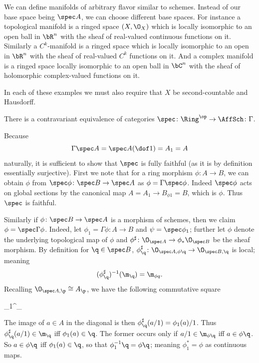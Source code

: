 \eexam

\bremark

    We can define manifolds of arbitrary flavor similar to schemes.
    Instead of our base space being $\spec A$, we can choose different base spaces.
    For instance a topological manifold is a ringed space $(X,\O_X)$ which is locally isomorphic to an open ball in $\bR^n$
    with the sheaf of real-valued continuous functions on it.
    Similarly a $C^k$-manifold is a ringed space which is locally isomorphic to an open in $\bR^n$ with the sheaf of real-valued
    $C^k$ functions on it.
    And a complex manifold is a ringed space locally isomorphic to an open ball in $\bC^n$ with the sheaf of holomorphic
    complex-valued functions on it.

    In each of these examples we must also require that $X$ be second-countable and Hausdorff.

\eremark

\bthrm[name={specsectionequiv}]

    There is a contravariant equivalence of categories $\spec\colon\Ring^\op\to\AffSch\colon\Gamma$.

\ethrm

\bproof

    Because
    $$ \Gamma\spec A = \spec A(\dof 1) = A_1 = A $$
    naturally, it is sufficient to show that $\spec$ is fully faithful (as it is by definition essentially surjective).
    First we note that for a ring morphism $\phi\colon A\to B$, we can obtain $\phi$ from $\spec\phi\colon\spec B\to\spec A$
    as $\phi=\Gamma\spec\phi$.
    Indeed $\spec\phi$ acts on global sections by the canonical map $A=A_1\to B_{\phi1}=B$, which is $\phi$.
    Thus $\spec$ is faithful.

    Similarly if $\phi\colon\spec B\to\spec A$ is a morphism of schemes, then we claim $\phi=\spec\Gamma\phi$.
    Indeed, let $\phi_1=\Gamma\phi\colon A\to B$ and $\psi=\spec\phi_1$; further let $\phi$ denote the underlying topological
    map of $\phi$ and $\phi^\sharp\colon\O_{\spec A}\to\phi_*\O_{\spec B}$ be the sheaf morphism.
    By definition for $\q\in\spec B$, $\phi^\sharp_\q\colon\O_{\spec A,\phi\q}\to\O_{\spec B,\q}$ is local; meaning
    $$ (\phi^\sharp_\q)^{-1}(\m_\q) = \m_{\phi q} . $$
    Recalling $\O_{\spec A,\p}\cong A_\p$, we have the following commutative square

        {\phi_1}{\phi^\sharp_\q}{}{}

    The image of $a\in A$ in the diagonal is then $\phi^\sharp_\q(a/1)=\phi_1(a)/1$.
    Thus $\phi^\sharp_\q(a/1)\in\m_\q$ iff $\phi_1(a)\in\q$.
    The former occurs only if $a/1\in\m_{\phi\q}$ iff $a\in\phi\q$.
    So $a\in\phi\q$ iff $\phi_1(a)\in\q$, so that $\phi_1^{-1}\q=\phi\q$; meaning $\phi_1^*=\phi$ as continuous maps.

